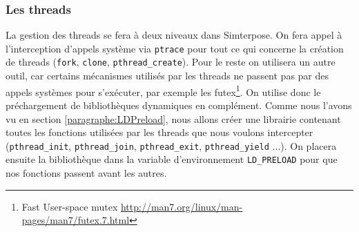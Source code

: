 \subsubsection{Les threads}

La gestion des threads se fera à deux niveaux dans Simterpose. On fera appel à l'interception d'appels système via \texttt{ptrace} pour tout ce qui concerne la création de threads (\texttt{fork}, \texttt{clone}, \texttt{pthread\_create}). Pour le reste on utilisera un autre outil, car certains mécanismes utilisés par les threads ne passent pas par des appels systèmes pour s'exécuter, par exemple les futex\footnote{Fast User-space mutex \url{http://man7.org/linux/man-pages/man7/futex.7.html}}. On utilise donc le préchargement de bibliothèques dynamiques en complément. Comme nous l'avons vu en section \ref{paragraphe:LDPreload}, nous allons créer une librairie contenant toutes les fonctions utilisées par les threads que nous voulons intercepter (\texttt{pthread\_init}, \texttt{pthread\_join}, \texttt{pthread\_exit}, \texttt{pthread\_yield} ...). On placera ensuite la bibliothèque dans la variable d'environnement \texttt{LD\_PRELOAD} pour que nos fonctions passent avant les autres.



